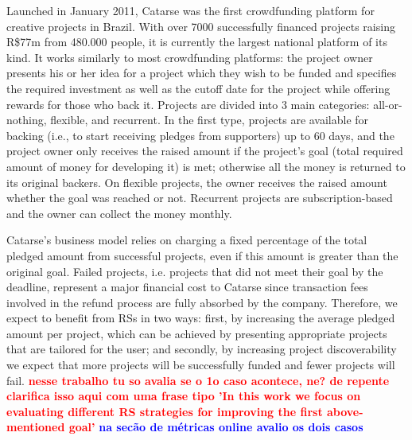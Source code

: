 \documentclass[cic,tc,english]{iiufrgs}
\newcommand{\bruno}[1]{\textcolor{red}{\textbf{#1}}}
\newcommand{\adriano}[1]{\textcolor{blue}{\textbf{#1}}}
\begin{document}
Launched in January 2011, Catarse was the first crowdfunding platform for creative projects in Brazil. With over 7000 successfully financed projects raising R\$77m from 480.000 people, it is currently the largest national platform of its kind. It works similarly to most crowdfunding platforms: the project owner presents his or her idea for a project which they wish to be funded and specifies the required investment as well as the cutoff date for the project while offering rewards for those who back it. Projects are divided into 3 main categories: all-or-nothing, flexible, and recurrent. In the first type, projects are available for backing (i.e., to start receiving pledges from supporters) up to 60 days, and the project owner only receives the raised amount if the project's goal (total required amount of money for developing it) is met; otherwise all the money is returned to its original backers. On flexible projects, the owner receives the raised amount whether the goal was reached or not. Recurrent projects are subscription-based and the owner can collect the money monthly. 

Catarse's business model relies on charging a fixed percentage of the total pledged amount from successful projects, even if this amount is greater than the original goal. Failed projects, i.e. projects that did not meet their goal by the deadline, represent a major financial cost to Catarse since transaction fees involved in the refund process are fully absorbed by the company. Therefore, we expect to benefit from RSs in two ways: first, by increasing the average pledged amount per project, which can be achieved by presenting appropriate projects that are tailored for the user; and secondly, by increasing project discoverability we expect that more projects will be successfully funded and fewer projects will fail. \bruno{nesse trabalho tu so avalia se o 1o caso acontece, ne? de repente clarifica isso aqui com uma frase tipo 'In this work we focus on evaluating different RS strategies for improving the first above-mentioned goal'} \adriano{na secão de métricas online avalio os dois casos}
\end{document}
